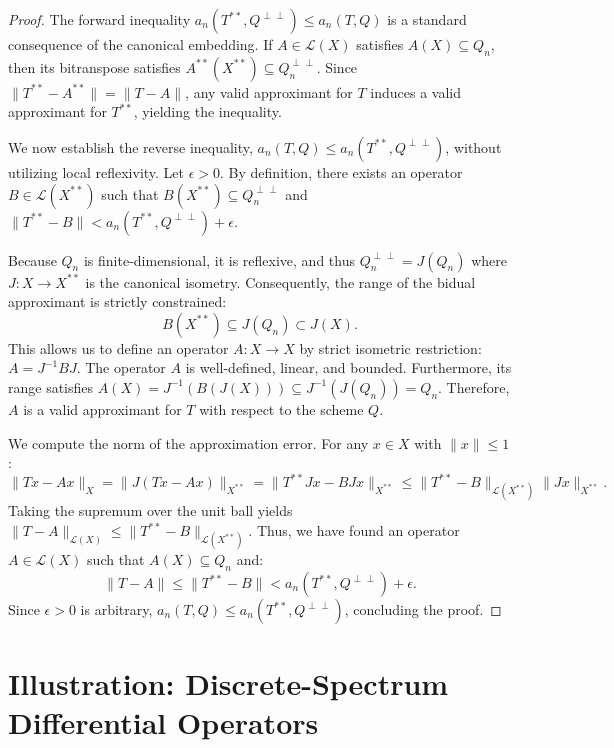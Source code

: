 \documentclass[11pt,reqno]{amsart}
\theoremstyle{definition}
\begin{document}
\begin{proof}
The forward inequality $a_n(T^{**}, Q^{\perp\perp}) \le a_n(T, Q)$ is a standard consequence of the canonical embedding. If $A \in \mathcal{L}(X)$ satisfies $A(X) \subseteq Q_n$, then its bitranspose satisfies $A^{**}(X^{**}) \subseteq Q_n^{\perp\perp}$. Since $\|T^{**} - A^{**}\| = \|T - A\|$, any valid approximant for $T$ induces a valid approximant for $T^{**}$, yielding the inequality.

We now establish the reverse inequality, $a_n(T, Q) \le a_n(T^{**}, Q^{\perp\perp})$, without utilizing local reflexivity. Let $\epsilon > 0$. By definition, there exists an operator $B \in \mathcal{L}(X^{**})$ such that $B(X^{**}) \subseteq Q_n^{\perp\perp}$ and $\|T^{**} - B\| < a_n(T^{**}, Q^{\perp\perp}) + \epsilon$.

Because $Q_n$ is finite-dimensional, it is reflexive, and thus $Q_n^{\perp\perp} = J(Q_n)$ where $J: X \to X^{**}$ is the canonical isometry. Consequently, the range of the bidual approximant is strictly constrained:
\begin{equation}
B(X^{**}) \subseteq J(Q_n) \subset J(X).
\end{equation}
This allows us to define an operator $A: X \to X$ by strict isometric restriction: $A = J^{-1} B J$. The operator $A$ is well-defined, linear, and bounded. Furthermore, its range satisfies $A(X) = J^{-1}(B(J(X))) \subseteq J^{-1}(J(Q_n)) = Q_n$. Therefore, $A$ is a valid approximant for $T$ with respect to the scheme $Q$.

We compute the norm of the approximation error. For any $x \in X$ with $\|x\| \le 1$:
\begin{equation}
\|Tx - Ax\|_X = \|J(Tx - Ax)\|_{X^{**}} = \|T^{**}Jx - BJx\|_{X^{**}} \le \|T^{**} - B\|_{\mathcal{L}(X^{**})} \|Jx\|_{X^{**}}.
\end{equation}
Taking the supremum over the unit ball yields $\|T - A\|_{\mathcal{L}(X)} \le \|T^{**} - B\|_{\mathcal{L}(X^{**})}$. Thus, we have found an operator $A \in \mathcal{L}(X)$ such that $A(X) \subseteq Q_n$ and:
\begin{equation}
\|T - A\| \le \|T^{**} - B\| < a_n(T^{**}, Q^{\perp\perp}) + \epsilon.
\end{equation}
Since $\epsilon > 0$ is arbitrary, $a_n(T, Q) \le a_n(T^{**}, Q^{\perp\perp})$, concluding the proof.
\end{proof}

\section{Illustration: Discrete-Spectrum Differential Operators}
\end{document}
